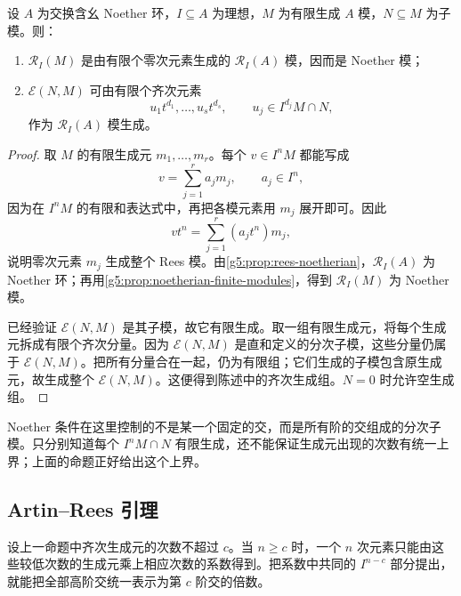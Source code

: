 \begin{proposition}\label{g5:prop:rees-module-noetherian}
	设 \(A\) 为交换含幺 Noether 环，\(I\subseteq A\) 为理想，\(M\) 为有限生成 \(A\) 模，\(N\subseteq M\) 为子模。则：
	\begin{enumerate}
		\item \(\mathcal R_I(M)\) 是由有限个零次元素生成的 \(\mathcal R_I(A)\) 模，因而是 Noether 模；
		\item \(\mathcal E(N,M)\) 可由有限个齐次元素
		\[
			u_1t^{d_1},\ldots,u_st^{d_s},
			\qquad u_j\in I^{d_j}M\cap N,
		\]
		作为 \(\mathcal R_I(A)\) 模生成。
	\end{enumerate}
\end{proposition}
\begin{proof}
	取 \(M\) 的有限生成元 \(m_1,\ldots,m_r\)。每个 \(v\in I^nM\) 都能写成
	\[
		v=\sum_{j=1}^r a_jm_j,\qquad a_j\in I^n,
	\]
	因为在 \(I^nM\) 的有限和表达式中，再把各模元素用 \(m_j\) 展开即可。因此
	\[
		vt^n=\sum_{j=1}^r(a_jt^n)m_j,
	\]
	说明零次元素 \(m_j\) 生成整个 Rees 模。由\cref{g5:prop:rees-noetherian}，\(\mathcal R_I(A)\) 为 Noether 环；再用\cref{g5:prop:noetherian-finite-modules}，得到 \(\mathcal R_I(M)\) 为 Noether 模。

	已经验证 \(\mathcal E(N,M)\) 是其子模，故它有限生成。取一组有限生成元，将每个生成元拆成有限个齐次分量。因为 \(\mathcal E(N,M)\) 是直和定义的分次子模，这些分量仍属于 \(\mathcal E(N,M)\)。把所有分量合在一起，仍为有限组；它们生成的子模包含原生成元，故生成整个 \(\mathcal E(N,M)\)。这便得到陈述中的齐次生成组。\(N=0\) 时允许空生成组。
\end{proof}

Noether 条件在这里控制的不是某一个固定的交，而是所有阶的交组成的分次子模。只分别知道每个 \(I^nM\cap N\) 有限生成，还不能保证生成元出现的次数有统一上界；上面的命题正好给出这个上界。

\subsection{Artin–Rees 引理}
\label{g5:subsec:0702:03}

设上一命题中齐次生成元的次数不超过 \(c\)。当 \(n\geq c\) 时，一个 \(n\) 次元素只能由这些较低次数的生成元乘上相应次数的系数得到。把系数中共同的 \(I^{n-c}\) 部分提出，就能把全部高阶交统一表示为第 \(c\) 阶交的倍数。

